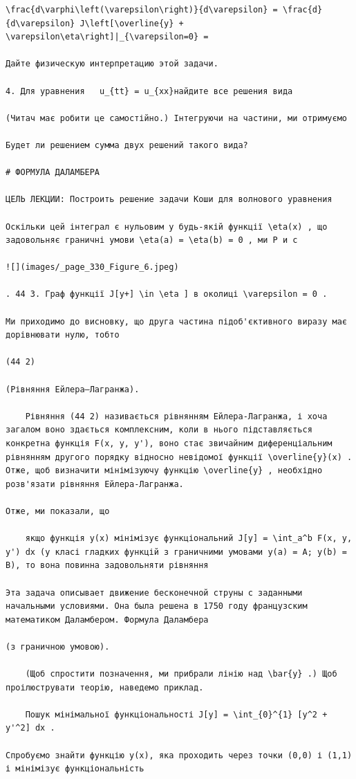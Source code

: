 \documentclass[
  ukrainian,
]{article}
\begin{document}
\begin{verbatim}
\frac{d\varphi\left(\varepsilon\right)}{d\varepsilon} = \frac{d}{d\varepsilon} J\left[\overline{y} + \varepsilon\eta\right]|_{\varepsilon=0} =

Дайте физическую интерпретацию этой задачи.

4. Для уравнения   u_{tt} = u_{xx}найдите все решения вида

(Читач має робити це самостійно.) Інтегруючи на частини, ми отримуємо

Будет ли решением сумма двух решений такого вида?

# ФОРМУЛА ДАЛАМБЕРА

ЦЕЛЬ ЛЕКЦИИ: Построить решение задачи Коши для волнового уравнения

Оскільки цей інтеграл є нульовим у будь-якій функції \eta(x) , що задовольняє граничні умови \eta(a) = \eta(b) = 0 , ми Р и с

![](images/_page_330_Figure_6.jpeg)

. 44 3. Граф функції J[y+] \in \eta ] в околиці \varepsilon = 0 .

Ми приходимо до висновку, що друга частина підоб'єктивного виразу має дорівнювати нулю, тобто

(44 2)

(Рівняння Ейлера–Лагранжа).

    Рівняння (44 2) називається рівнянням Ейлера-Лагранжа, і хоча загалом воно здається комплексним, коли в нього підставляється конкретна функція F(x, y, y'), воно стає звичайним диференціальним рівнянням другого порядку відносно невідомої функції \overline{y}(x) . Отже, щоб визначити мінімізуючу функцію \overline{y} , необхідно розв'язати рівняння Ейлера-Лагранжа.

Отже, ми показали, що

    якщо функція y(x) мінімізує функціональний J[y] = \int_a^b F(x, y, y') dx (у класі гладких функцій з граничними умовами y(a) = A; y(b) = B), то вона повинна задовольняти рівняння

Эта задача описывает движение бесконечной струны с заданными начальными условиями. Она была решена в 1750 году французским математиком Даламбером. Формула Даламбера

(з граничною умовою).

    (Щоб спростити позначення, ми прибрали лінію над \bar{y} .) Щоб проілюструвати теорію, наведемо приклад.

    Пошук мінімальної функціональності J[y] = \int_{0}^{1} [y^2 + y'^2] dx .

Спробуємо знайти функцію y(x), яка проходить через точки (0,0) і (1,1) і мінімізує функціональність


\end{verbatim}
\end{document}
